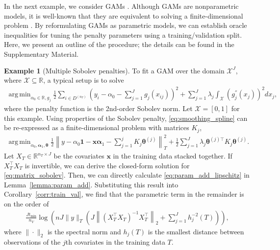 \documentclass[12pt]{article} %
\theoremstyle{definition}
\newtheorem{example}{Example}
\DeclareMathOperator*{\argmin}{arg\,min}
\begin{document}
In the next example, we consider GAMs \citep{hastie1990generalized}.
Although GAMs are nonparametric models, it is well-known that they are equivalent to solving a finite-dimensional problem \citep*{green1993nonparametric, o1986automatic, buja1989linear}.
By reformulating GAMs as parametric models, we can establish oracle inequalities for tuning the penalty parameters using a training/validation split.
Here, we present an outline of the procedure; the details can be found in the Supplementary Material.
\begin{example}[Multiple Sobolev penalties]
	\label{example:sobolev}
	To fit a GAM over the domain $\mathcal{X}^J$, where $\mathcal{X} \subseteq \mathbb{R}$, a typical setup is to solve
	\begin{align}
	\argmin_{\alpha_0 \in \mathbb{R}, g_j}
	\frac{1}{2} \sum_{i\in D^{(n_T)}}
	\left(
	y_i - \alpha_0 - \sum_{j=1}^J g_j(x_{ij})
	\right)^2
	+ \sum_{j=1}^{J} \lambda_j \int_{\mathcal{X}} \left(g_j^{''}(x_j)\right)^{2} dx_j,
	\label{eq:smoothing_spline}
	\end{align}
	where the penalty function is the 2nd-order Sobolev norm.
	Let $\mathcal{X} = [0,1]$ for this example.
	Using properties of the Sobolev penalty, \eqref{eq:smoothing_spline} can be re-expressed as a finite-dimensional problem with matrices $K_j$,
	\begin{align}
	\argmin_{\alpha_0, \boldsymbol{\alpha}_1, \boldsymbol{\theta}}
	\frac{1}{2}
	\left \|
	y -
	\alpha_0 \boldsymbol{1}
	- \boldsymbol{x} \boldsymbol{\alpha}_1
	- \sum_{j=1}^j K_j \boldsymbol{\theta}^{(j)}
	\right \|^2_T
	+
	\frac{1}{2}
	\sum_{j = 1}^J
	\lambda_j \boldsymbol{\theta}^{(j)\top} K_j \boldsymbol{\theta}^{(j)}.
	\label{eq:matrix_sobolev}
	\end{align}
	Let $X_T \in \mathbb{R}^{n_T\times J}$ be the covariates $\boldsymbol{x}$ in the training data stacked together.
	If $X_T^\top X_T$ is invertible, we can derive the closed-form solution for \eqref{eq:matrix_sobolev}.
	Then, we can directly calculate \eqref{eq:param_add_lipschitz} in Lemma~\ref{lemma:param_add}.
	Substituting this result into Corollary~\ref{corr:train_val}, we find that the parametric term in the remainder is on the order of
	\begin{align}
	\frac{J t_{\min}}{n_{V}} \log \left (
	n
	J
	\|y\|_T
	\left(
	J
	\left \|
	\left(
	X_T^\top X_T
	\right)^{-1}
	X_T^\top
	\right \|_2
	+
	\sum_{j=1}^J h_j^{-2}(T)
	\right)
	\right ),
	\label{eq:sobolev_param}
	\end{align}
	where $\|\cdot\|_2$ is the spectral norm and $h_j(T)$ is the smallest distance between observations of the $j$th covariates in the training data $T$.


\end{example}
\end{document}
